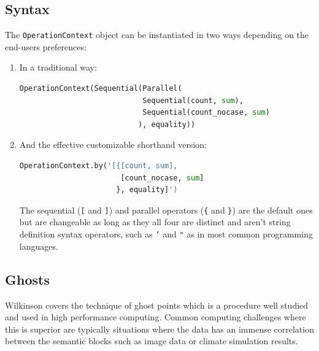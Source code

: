 \subsection{Syntax}
The \texttt{OperationContext} object can be instantiated in two ways depending on the end-users preferences:
\vspace*{2mm}

\begin{enumerate}
	\item In a traditional way:
\vspace*{2mm}
\begin{lstlisting}[language=Python, basicstyle=\footnotesize, numbers=none, showtabs=false, showstringspaces=false, showspaces=false, 
otherkeywords={[,{,},],Sequential,Parallel,OperationContext}, deletendkeywords={sum}]
OperationContext(Sequential(Parallel(
                            Sequential(count, sum), 
                            Sequential(count_nocase, sum)
                           ), equality))
\end{lstlisting}
\vspace*{-2mm}
	\item And the effective customizable shorthand version:
\vspace*{2mm}
\begin{lstlisting}[language=Python, basicstyle=\footnotesize, numbers=none, showtabs=false, showstringspaces=false, showspaces=false, 
otherkeywords={[,{,},],Sequential,Parallel,OperationContext}, deletendkeywords={sum}]
OperationContext.by('[{[count, sum], 
                       [count_nocase, sum]
                      }, equality]')
\end{lstlisting}
\vspace*{-2mm}
	The sequential (\texttt{[} and \texttt{]}) and parallel operators (\texttt{\{} and \texttt{\}}) are the default ones but are changeable as long as they all four are distinct and aren't string definition syntax operators, such as \texttt{'} and \texttt{"} as in most common programming languages.
\end{enumerate}

\subsection{Ghosts}
Wilkinson \etal covers the technique of ghost points\cite{Wilkinson:1998:PPT:289352} which is a procedure well studied and used in high performance computing. Common computing challenges where this is superior are typically situations where the data has an immense correlation between the semantic blocks such as image data or climate simulation results. 
\newline

